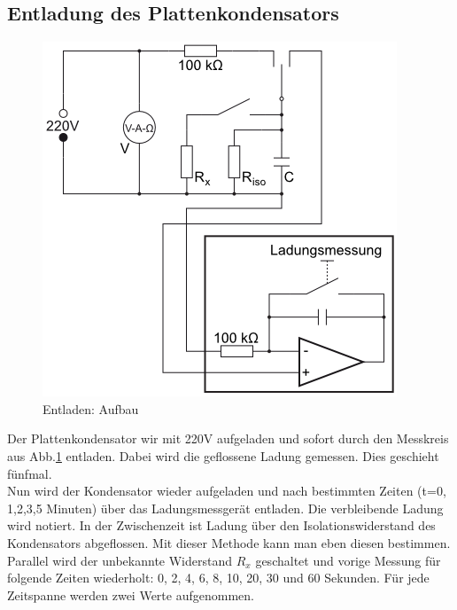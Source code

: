 \documentclass[12pt,a4paper,titlepage,headinclude,bibtotoc]{scrartcl}
\begin{document}
\subsection{Entladung des Plattenkondensators}
\begin{figure}[!htb]
	\centering
	\includegraphics[scale=0.7]{Entladen.png}
	\caption{Entladen: Aufbau \cite[Datum: 25.09.2014]{LP11}}
	\label{fig:Entladen}
\end{figure}

Der  Plattenkondensator wir mit 220V aufgeladen und sofort durch den Messkreis aus Abb.\ref{fig:Entladen} entladen.
Dabei wird die geflossene Ladung gemessen.
Dies geschieht fünfmal.\\
Nun wird der Kondensator wieder aufgeladen und nach bestimmten Zeiten (t=0, 1,2,3,5 Minuten) über das Ladungsmessgerät entladen.
Die verbleibende Ladung wird notiert.
In der Zwischenzeit ist Ladung über den Isolationswiderstand des Kondensators abgeflossen.
Mit dieser Methode kann man eben diesen bestimmen.\\
Parallel wird der unbekannte Widerstand $R_x$ geschaltet und vorige Messung für folgende Zeiten wiederholt: 0, 2, 4, 6, 8, 10, 20, 30 und 60 Sekunden.
Für jede Zeitspanne werden zwei Werte aufgenommen.
\end{document}
